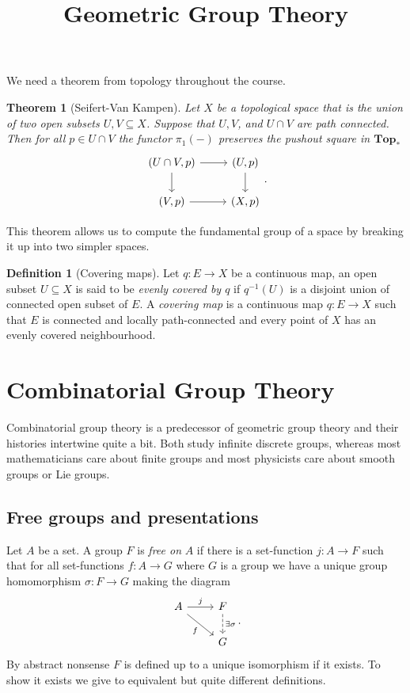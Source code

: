 \documentclass{report}
\theoremstyle{definition}
\theoremstyle{plain}
\newtheorem*{thm*}{Theorem}
\theoremstyle{definition}
\newtheorem*{defn*}{Definition}
\begin{document}
	\title{Geometric Group Theory}
	\maketitle
	We need a theorem from topology throughout the course.
	\begin{thm*}[Seifert-Van Kampen]
		Let $X$ be a topological space that is the union of two open subsets $U,V\subseteq X$. Suppose that $U,V$, and $U\cap V$ are path connected. Then for all $p\in U\cap V$ the functor $\pi_1(-)$ preserves the pushout square in $\textbf{Top}_\ast$
		\[\begin{tikzcd}
			{(U\cap V,p)} & {(U,p)} \\
			{(V,p)} & {(X,p)}
			\arrow[from=1-1, to=2-1]
			\arrow[from=1-1, to=1-2]
			\arrow[from=2-1, to=2-2]
			\arrow[from=1-2, to=2-2]
		\end{tikzcd}.\]
	\end{thm*}
	This theorem allows us to compute the fundamental group of a space by breaking it up into two simpler spaces.
	
	\begin{defn*}[Covering maps]
		Let $q\colon E \to X$ be a continuous map, an open subset $U\subseteq X$ is said to be \emph{evenly covered by $q$} if $q^{-1}(U)$ is a disjoint union of connected open subset of $E$. A \emph{covering map} is a continuous map $q\colon E \to X$ such that $E$ is connected and locally path-connected and every point of $X$ has an evenly covered neighbourhood.
	\end{defn*}
	
	\chapter{Combinatorial Group Theory}
	Combinatorial group theory is a predecessor of geometric group theory and their histories intertwine quite a bit. Both study infinite discrete groups, whereas most mathematicians care about finite groups and most physicists care about smooth groups or Lie groups.
	\section{Free groups and presentations}
	Let $A$ be a set. A group $F$ is \emph{free on }$A$ if there is a set-function $j\colon A \to F$ such that for all set-functions $f\colon A \to G$ where $G$ is a group we have a unique group homomorphism $\sigma \colon F \to G$ making the diagram
	\[\begin{tikzcd}
		A & F \\
		& G
		\arrow["j", from=1-1, to=1-2]
		\arrow["f"', from=1-1, to=2-2]
		\arrow["{\exists \sigma}", dashed, from=1-2, to=2-2]
	\end{tikzcd}.\]
	By abstract nonsense $F$ is defined up to a unique isomorphism if it exists. To show it exists we give to equivalent but quite different definitions.
	
\end{document}
